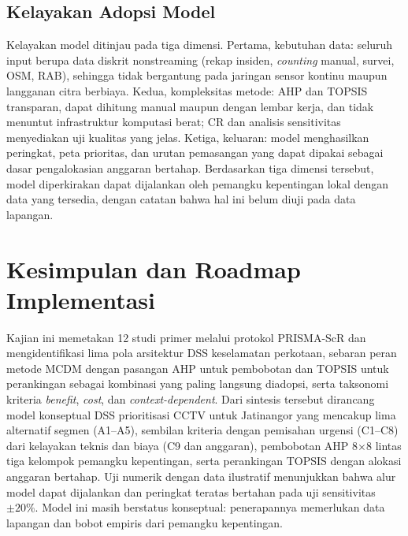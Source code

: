 \documentclass[10pt,twocolumn,a4paper]{article}
\begin{document}
\subsection{Kelayakan Adopsi Model}
Kelayakan model ditinjau pada tiga dimensi. Pertama, kebutuhan data: seluruh input berupa data diskrit nonstreaming (rekap insiden, \textit{counting} manual, survei, OSM, RAB), sehingga tidak bergantung pada jaringan sensor kontinu maupun langganan citra berbiaya. Kedua, kompleksitas metode: AHP dan TOPSIS transparan, dapat dihitung manual maupun dengan lembar kerja, dan tidak menuntut infrastruktur komputasi berat; CR dan analisis sensitivitas menyediakan uji kualitas yang jelas. Ketiga, keluaran: model menghasilkan peringkat, peta prioritas, dan urutan pemasangan yang dapat dipakai sebagai dasar pengalokasian anggaran bertahap. Berdasarkan tiga dimensi tersebut, model diperkirakan dapat dijalankan oleh pemangku kepentingan lokal dengan data yang tersedia, dengan catatan bahwa hal ini belum diuji pada data lapangan.

\section{Kesimpulan dan Roadmap Implementasi}
Kajian ini memetakan 12 studi primer melalui protokol PRISMA-ScR dan mengidentifikasi lima pola arsitektur DSS keselamatan perkotaan, sebaran peran metode MCDM dengan pasangan AHP untuk pembobotan dan TOPSIS untuk perankingan sebagai kombinasi yang paling langsung diadopsi, serta taksonomi kriteria \textit{benefit}, \textit{cost}, dan \textit{context-dependent}. Dari sintesis tersebut dirancang model konseptual DSS prioritisasi CCTV untuk Jatinangor yang mencakup lima alternatif segmen (A1--A5), sembilan kriteria dengan pemisahan urgensi (C1--C8) dari kelayakan teknis dan biaya (C9 dan anggaran), pembobotan AHP 8$\times$8 lintas tiga kelompok pemangku kepentingan, serta perankingan TOPSIS dengan alokasi anggaran bertahap. Uji numerik dengan data ilustratif menunjukkan bahwa alur model dapat dijalankan dan peringkat teratas bertahan pada uji sensitivitas $\pm 20\%$. Model ini masih berstatus konseptual: penerapannya memerlukan data lapangan dan bobot empiris dari pemangku kepentingan.
\end{document}
